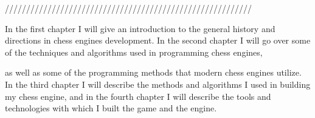 //////////////////////////////////////////////////////////

In the first chapter I will give an introduction to the general history and directions in chess engines development. In the second chapter I will go over some of the techniques and algorithms used in programming chess engines, 

as well as some of the programming methods that modern chess engines utilize. In the third chapter I will describe the methods and algorithms I used in building my chess engine, and in the fourth chapter I will describe the tools and technologies with which I built the game and the engine.

